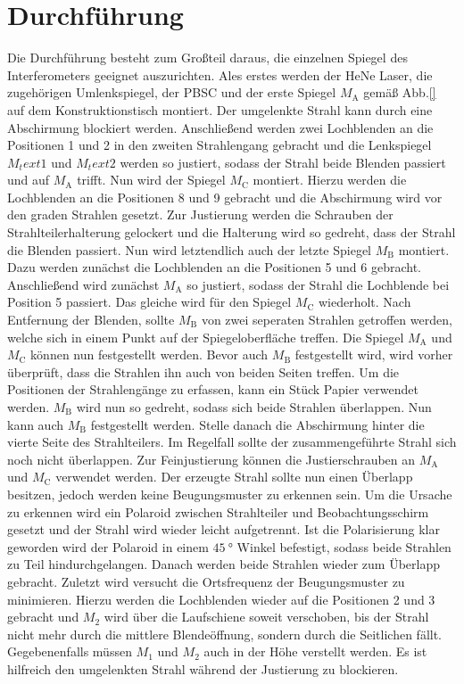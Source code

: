 
\section{Durchführung}
\label{sec:Durchführung}
Die Durchführung besteht zum Großteil daraus, die einzelnen Spiegel des Interferometers geeignet auszurichten. %
Ales erstes werden der HeNe Laser, die zugehörigen Umlenkspiegel, der PBSC und der erste Spiegel $M_\text{A}$ gemäß Abb.\ref{} auf dem Konstruktionstisch montiert. Der umgelenkte Strahl kann durch eine Abschirmung blockiert werden. Anschließend werden zwei Lochblenden an die Positionen 1 und 2 in den zweiten Strahlengang gebracht und die Lenkspiegel $M_text{1}$ und $M_text{2}$ werden so justiert, sodass der Strahl beide Blenden passiert und auf $M_\text{A}$ trifft. Nun wird der Spiegel $M_\text{C}$ montiert. Hierzu werden die Lochblenden an die Positionen 8 und 9 gebracht und die Abschirmung wird vor den graden Strahlen gesetzt. 
Zur Justierung werden die Schrauben der Strahlteilerhalterung gelockert und die Halterung wird so gedreht, dass der Strahl die Blenden passiert. Nun wird letztendlich auch der letzte Spiegel $M_\text{B}$ montiert. Dazu werden zunächst die Lochblenden an die Positionen 5 und 6 gebracht. Anschließend wird zunächst $M_\text{A}$ so justiert, sodass der Strahl die Lochblende bei Position 5 passiert. Das gleiche wird für den Spiegel $M_\text{C}$ wiederholt. Nach Entfernung der Blenden, sollte $M_\text{B}$ von zwei seperaten Strahlen getroffen werden, welche sich in einem Punkt auf der Spiegeloberfläche treffen. Die Spiegel $M_\text{A}$ und $M_\text{C}$ können nun festgestellt werden. Bevor auch $M_\text{B}$ festgestellt wird, wird vorher überprüft, dass die Strahlen ihn auch von beiden Seiten treffen. Um die Positionen der Strahlengänge zu erfassen, kann ein Stück Papier verwendet werden. $M_\text{B}$ wird nun so gedreht, sodass sich beide Strahlen überlappen. Nun kann auch $M_\text{B}$ festgestellt werden. Stelle danach die Abschirmung hinter die vierte Seite des Strahlteilers. Im Regelfall sollte der zusammengeführte Strahl sich noch nicht überlappen. Zur Feinjustierung können die Justierschrauben an $M_\text{A}$ und $M_\text{C}$ verwendet werden. Der erzeugte Strahl sollte nun einen Überlapp besitzen, jedoch werden keine Beugungsmuster zu erkennen sein. Um die Ursache zu erkennen wird ein Polaroid zwischen Strahlteiler und Beobachtungsschirm gesetzt und der Strahl wird wieder leicht aufgetrennt. Ist die Polarisierung klar geworden wird der Polaroid in einem $\SI{45}{\degree}$ Winkel befestigt, sodass beide Strahlen zu Teil hindurchgelangen. Danach werden beide Strahlen wieder zum Überlapp gebracht. Zuletzt wird versucht die Ortsfrequenz der Beugungsmuster zu minimieren. Hierzu werden die Lochblenden wieder auf die Positionen 2 und 3 gebracht und $M_\text{2}$ wird über die Laufschiene soweit verschoben, bis der Strahl nicht mehr durch die mittlere Blendeöffnung, sondern durch die Seitlichen fällt. Gegebenenfalls müssen $M_\text{1}$ und $M_\text{2}$ auch in der Höhe verstellt werden. Es ist hilfreich den umgelenkten Strahl während der Justierung zu blockieren.
